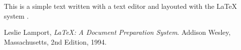 This is a simple text written with a text editor and layouted with the {\LaTeX} system \cite{lamport94}.

\begin{thebibliography}{9}

  Leslie Lamport, 
  \emph{{\LaTeX}: A Document Preparation System}.
  Addison Wesley, Massachusetts, 
  2nd Edition, 1994.

\end{thebibliography}
